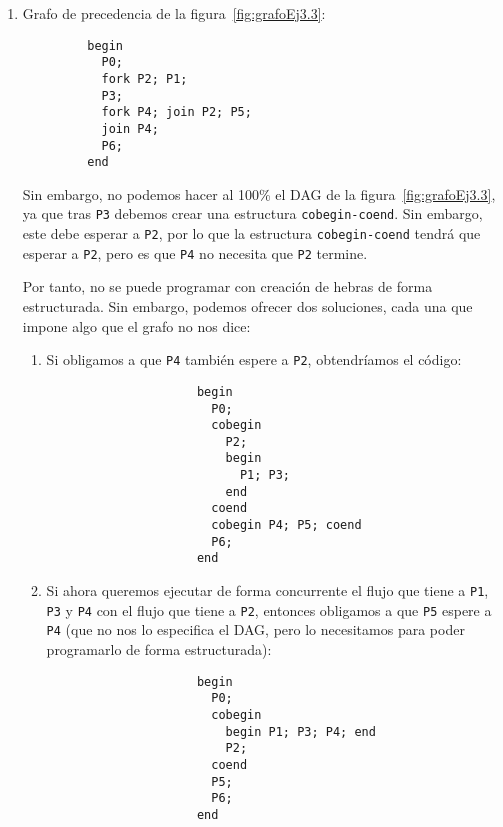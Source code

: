 \begin{ejercicio}
\begin{enumerate}
         \item \label{ej:3.3}
         Grafo de precedencia de la figura~\ref{fig:grafoEj3.3}:
         \begin{verbatim}
         begin
           P0;
           fork P2; P1;
           P3;
           fork P4; join P2; P5;
           join P4;
           P6;
         end
         \end{verbatim}

         Sin embargo, no podemos hacer al 100\% el DAG de la figura~\ref{fig:grafoEj3.3}, ya que tras \verb|P3| debemos crear una estructura \verb|cobegin-coend|. Sin embargo, este debe esperar a \verb|P2|, por lo que la estructura \verb|cobegin-coend| tendrá que esperar a \verb|P2|, pero es que \verb|P4| no necesita que \verb|P2| termine. 

         Por tanto, no se puede programar con creación de hebras de forma estructurada. Sin embargo, podemos ofrecer dos soluciones, cada una que impone algo que el grafo no nos dice:
         \begin{enumerate}
             \item Si obligamos a que \verb|P4| también espere a \verb|P2|, obtendríamos el código:
                 \begin{verbatim}
                     begin
                       P0;
                       cobegin
                         P2;
                         begin
                           P1; P3;
                         end
                       coend
                       cobegin P4; P5; coend
                       P6;
                     end
                 \end{verbatim}
                 
             \item Si ahora queremos ejecutar de forma concurrente el flujo que tiene a \verb|P1|, \verb|P3| y \verb|P4| con el flujo que tiene a \verb|P2|, entonces obligamos a que \verb|P5| espere a \verb|P4| (que no nos lo especifica el DAG, pero lo necesitamos para poder programarlo de forma estructurada):
                 \begin{verbatim}
                     begin
                       P0;
                       cobegin
                         begin P1; P3; P4; end
                         P2;
                       coend
                       P5;
                       P6;
                     end
                 \end{verbatim}
                 
         \end{enumerate}
    \end{enumerate}

\end{ejercicio}



